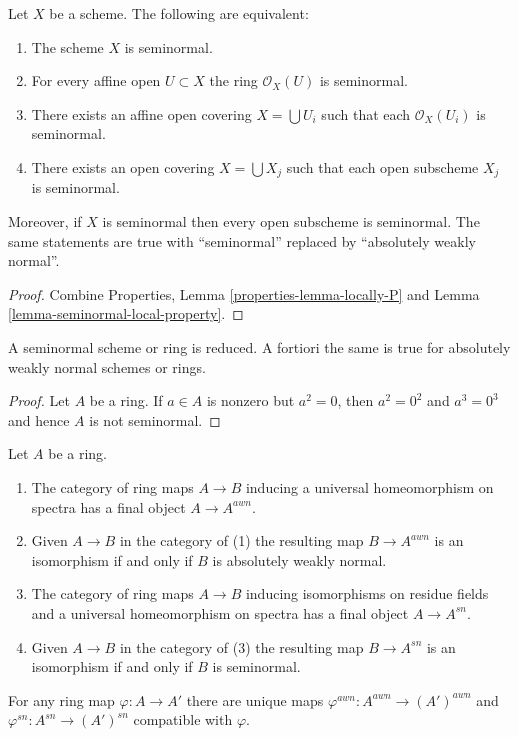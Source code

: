\begin{lemma}
\label{lemma-locally-seminormal}
Let $X$ be a scheme. The following are equivalent:
\begin{enumerate}
\item The scheme $X$ is seminormal.
\item For every affine open $U \subset X$ the ring $\mathcal{O}_X(U)$
is seminormal.
\item There exists an affine open covering $X = \bigcup U_i$ such that
each $\mathcal{O}_X(U_i)$ is seminormal.
\item There exists an open covering $X = \bigcup X_j$
such that each open subscheme $X_j$ is seminormal.
\end{enumerate}
Moreover, if $X$ is seminormal
then every open subscheme is seminormal.
The same statements are true with ``seminormal'' replaced by
``absolutely weakly normal''.
\end{lemma}

\begin{proof}
Combine Properties, Lemma \ref{properties-lemma-locally-P} and
Lemma \ref{lemma-seminormal-local-property}.
\end{proof}

\begin{lemma}
\label{lemma-seminormal-reduced}
A seminormal scheme or ring is reduced. A fortiori the same
is true for absolutely weakly normal schemes or rings.
\end{lemma}

\begin{proof}
Let $A$ be a ring.
If $a \in A$ is nonzero but $a^2 = 0$, then $a^2 = 0^2$ and
$a^3 = 0^3$ and hence $A$ is not seminormal.
\end{proof}

\begin{lemma}
\label{lemma-seminormalization-ring}
Let $A$ be a ring.
\begin{enumerate}
\item The category of ring maps $A \to B$ inducing a
universal homeomorphism on spectra has a final object $A \to A^{awn}$.
\item Given $A \to B$ in the category of (1) the resulting map
$B \to A^{awn}$ is an isomorphism if and only if $B$ is
absolutely weakly normal.
\item The category of ring maps $A \to B$ inducing isomorphisms on
residue fields and a universal homeomorphism on spectra has a final
object $A \to A^{sn}$.
\item Given $A \to B$ in the category of (3) the resulting map
$B \to A^{sn}$ is an isomorphism if and only if $B$ is seminormal.
\end{enumerate}
For any ring map $\varphi : A \to A'$ there are unique maps
$\varphi^{awn} : A^{awn} \to (A')^{awn}$ and
$\varphi^{sn} : A^{sn} \to (A')^{sn}$ compatible with $\varphi$.
\end{lemma}

